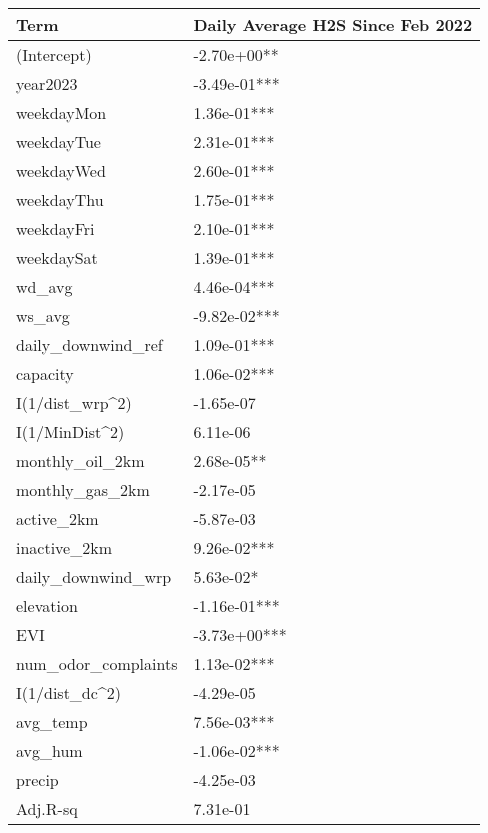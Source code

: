 
\begin{tabular}{l|l}
\hline
Term & Daily Average H2S Since Feb 2022\\
\hline
(Intercept) & -2.70e+00**\\
\hline
year2023 & -3.49e-01***\\
\hline
weekdayMon & 1.36e-01***\\
\hline
weekdayTue & 2.31e-01***\\
\hline
weekdayWed & 2.60e-01***\\
\hline
weekdayThu & 1.75e-01***\\
\hline
weekdayFri & 2.10e-01***\\
\hline
weekdaySat & 1.39e-01***\\
\hline
wd\_avg & 4.46e-04***\\
\hline
ws\_avg & -9.82e-02***\\
\hline
daily\_downwind\_ref & 1.09e-01***\\
\hline
capacity & 1.06e-02***\\
\hline
I(1/dist\_wrp\textasciicircum{}2) & -1.65e-07\\
\hline
I(1/MinDist\textasciicircum{}2) & 6.11e-06\\
\hline
monthly\_oil\_2km & 2.68e-05**\\
\hline
monthly\_gas\_2km & -2.17e-05\\
\hline
active\_2km & -5.87e-03\\
\hline
inactive\_2km & 9.26e-02***\\
\hline
daily\_downwind\_wrp & 5.63e-02*\\
\hline
elevation & -1.16e-01***\\
\hline
EVI & -3.73e+00***\\
\hline
num\_odor\_complaints & 1.13e-02***\\
\hline
I(1/dist\_dc\textasciicircum{}2) & -4.29e-05\\
\hline
avg\_temp & 7.56e-03***\\
\hline
avg\_hum & -1.06e-02***\\
\hline
precip & -4.25e-03\\
\hline
Adj.R-sq & 7.31e-01\\
\hline
\end{tabular}
